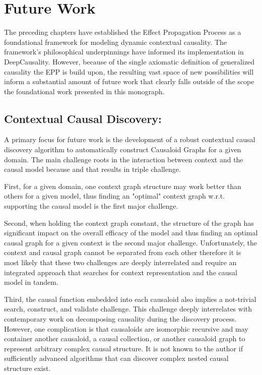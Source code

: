 \section{Future Work}
\label{sec:future_work}

The preceding chapters have established the Effect Propagation Process as a foundational framework for modeling dynamic contextual causality. The framework's philosophical underpinnings have informed its implementation in DeepCausality. However, because of the single axiomatic definition of generalized causality the EPP is build upon, the resulting vast space of new possibilities will inform a substantial amount of future work that clearly falls outside of the scope the foundational work presented in this monograph. 


\subsection{Contextual Causal Discovery:} 


A primary focus for future work is the development of a robust contextual causal discovery algorithm to automatically construct Causaloid Graphs for a given domain. The main challenge roots in the interaction between context and the causal model because and that results in triple challenge.

First, for a given domain, one context graph structure may work better than others for a given model, thus finding an "optimal" context graph w.r.t. supporting the causal model is the first major challenge. 

 Second, when holding the context graph constant, the structure of the graph has significant impact on the overall efficacy of the model and thus finding an optimal causal graph for a given context is the second major challenge. Unfortunately,  the context and causal graph cannot be separated from each other therefore it is most likely that these two challenges are deeply interrelated and require an integrated approach that searches for context representation and the causal model in tandem.  
 
Third, the causal function embedded into each causaloid also implies a not-trivial search, construct, and validate challenge. This challenge deeply interrelates with contemporary work on decomposing causality during the discovery process. However, one complication is that causaloids are isomorphic recursive and may container another causaloid, a causal collection, or another causaloid graph to represent arbitrary complex causal structure. It is not known to the author if sufficiently advanced algorithms that can discover complex nested causal structure exist. 


